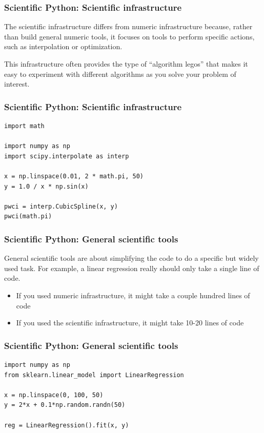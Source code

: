 \documentclass[
    xcolor={svgnames,dvipsnames},
    hyperref={colorlinks, citecolor=DeepPink4, linkcolor=DarkRed, urlcolor=DarkBlue}
]{beamer}  %
\newcommand{\1}{\mathbbm 1}
\begin{document}
\begin{frame}[fragile]
    \frametitle{Scientific Python: Scientific infrastructure}

    The scientific infrastructure differs from numeric infrastructure because, rather than build
    general numeric tools, it focuses on tools to perform specific actions, such as interpolation
    or optimization.

    This infrastructure often provides the type of ``algorithm legos'' that makes it easy to
    experiment with different algorithms as you solve your problem of interest.

\end{frame}

\begin{frame}[fragile]
    \frametitle{Scientific Python: Scientific infrastructure}
    \begin{verbatim}
import math

import numpy as np
import scipy.interpolate as interp

x = np.linspace(0.01, 2 * math.pi, 50)
y = 1.0 / x * np.sin(x)

pwci = interp.CubicSpline(x, y)
pwci(math.pi)

    \end{verbatim}

\end{frame}

\begin{frame}[fragile]
    \frametitle{Scientific Python: General scientific tools}

    General scientific tools are about simplifying the code to do a specific but widely used task.
    For example, a linear regression really should only take a single line of code.

    \begin{itemize}
        \item If you used numeric infrastructure, it might take a couple hundred lines of code
        \item If you used the scientific infrastructure, it might take 10-20 lines of code
    \end{itemize}

\end{frame}

\begin{frame}[fragile]
    \frametitle{Scientific Python: General scientific tools}

    \begin{verbatim}
import numpy as np
from sklearn.linear_model import LinearRegression

x = np.linspace(0, 100, 50)
y = 2*x + 0.1*np.random.randn(50)

reg = LinearRegression().fit(x, y)

    \end{verbatim}

\end{frame}
\end{document}
